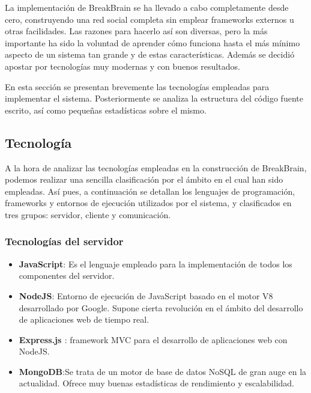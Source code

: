 La implementación de BreakBrain se ha llevado a cabo completamente desde cero, construyendo una red social completa sin emplear frameworks externos u otras facilidades. Las razones para hacerlo así son diversas, pero la más importante ha sido la voluntad de aprender cómo funciona hasta el más mínimo aspecto de un sistema tan grande y de estas características. Además se decidió apostar por tecnologías muy modernas y con buenos resultados.

En esta sección se presentan brevemente las tecnologías empleadas para implementar el sistema. Posteriormente se analiza la estructura del código fuente escrito, así como pequeñas estadísticas sobre el mismo.

\subsection{Tecnología}

A la hora de analizar las tecnologías empleadas en la construcción de BreakBrain, podemos realizar una sencilla clasificación por el ámbito en el cual han sido empleadas. Así pues, a continuación se detallan los lenguajes de programación, frameworks y entornos de ejecución utilizados por el sistema, y clasificados en tres grupos: servidor, cliente y comunicación.


\subsubsection{Tecnologías del servidor}

\begin{itemize}
\item {\bf JavaScript}: Es el lenguaje empleado para la implementación de todos los componentes del servidor.
\item {\bf NodeJS}: Entorno de ejecución de JavaScript basado en el motor V8 desarrollado por Google. Supone cierta revolución en el ámbito del desarrollo de aplicaciones web de tiempo real.
\item {\bf Express.js \cite{Visionmedia}}: framework MVC para el desarrollo de aplicaciones web con NodeJS.
\item {\bf MongoDB}:Se trata de un motor de base de datos NoSQL de gran auge en la actualidad. Ofrece muy buenas estadísticas de rendimiento y escalabilidad.
\end{itemize}


